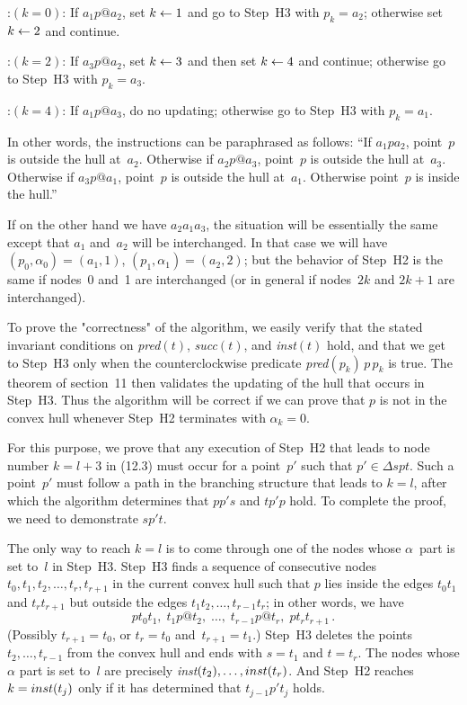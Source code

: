 \medskip
\display 60pt:$(k=0)$:
If $a_1p@ 
a_2$, set $k\leftarrow 1$ and go to Step~H3 with $p_k=a_2$; otherwise
set $k\leftarrow 2$ and continue.

\smallskip
\display 60pt:$(k=2)$:
If $a_3p@ a_2$, set $k\leftarrow 3$ and then set $k\leftarrow 4$ and continue;
otherwise go to Step~H3 with $p_k=a_3$.

\smallskip
\display 60pt:$(k=4)$:
If $a_1p@ a_3$, do no updating; otherwise go to Step~H3 with $p_k=a_1$.

\medskip\noindent
In other words, the instructions can be paraphrased as follows:
``If $a_1pa_2$, point~$p$ is outside the hull at~$a_2$. Otherwise if
$a_2p@ a_3$, point~$p$ is outside the hull at~$a_3$. Otherwise if
$a_3p@ a_1$, point~$p$ is outside the hull at~$a_1$. Otherwise
point~$p$ is inside the hull.''

If on the other hand we have $a_2a_1a_3$, the situation will be
essentially the same except that $a_1$ and~$a_2$ will be interchanged.
In that case we will have $(p_0,\alpha_0)=(a_1,1)$,
$(p_1,\alpha_1)=(a_2,2)$; but the behavior of Step~H2 is the same if
nodes~0 and~1 are interchanged (or in general if nodes~$2k$ and $2k+1$
are interchanged).

To prove the "correctness" of the algorithm, we easily verify that the
stated invariant conditions on {\sl pred\/}$(t)$, {\sl succ\/}$(t)$,
and {\sl inst\/}$(t)$ hold, and that we get to Step~H3 only when the
counterclockwise predicate {\sl pred\/}$(p_k)\,p\,p_k$ is true. The
theorem of section~11 then validates the updating of the hull that
occurs in Step~H3. Thus the algorithm will be correct if we can prove
that $p$ is not in the convex hull whenever Step~H2 terminates with
$\alpha_k=0$.

For this purpose, we prove that any execution of Step~H2 that leads to
node number $k=l+3$ in (12.3) must occur for a point~$p'$ such that
$p'\in\Delta spt$. Such a point~$p'$ must follow a path in the
branching structure that leads to $k=l$, after which the algorithm
determines that $pp's$ and $tp'p$ hold. To complete the proof, we need
to demonstrate $sp't$.

The only way to reach $k=l$ is to come through one of the nodes whose
$\alpha$~part is set to~$l$ in Step~H3. Step~H3 finds a sequence of
consecutive nodes $t_0,t_1,t_2,\ldots,t_r,t_{r+1}$ in the current
convex hull such that $p$ lies inside the edges $t_0t_1$ and
$t_rt_{r+1}$ but outside the edges $t_1t_2,\ldots,t_{r-1}t_r$; in
other words, we have
$$pt_0t_1,\;t_1p@t_2,\;\ldots,\;t_{r-1}p@t_r,\;pt_rt_{r+1}\,.$$
(Possibly $t_{r+1}=t_0$, or $t_r=t_0$ and~$t_{r+1}=t_1$.) Step~H3 deletes
the points $t_2,\ldots,t_{r-1}$ from the convex hull and ends with
$s=t_1$ and $t=t_r$. The nodes whose $\alpha$ part is set to~$l$ are
precisely {\sl inst\/}$(t_2),\ldots,{\sl inst\/}(t_r)$. And Step~H2
reaches $k={\sl inst\/}(t_j)$ only if it has determined that
$t_{j-1}p't_j$ holds. 

